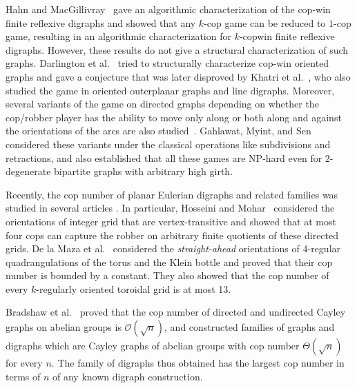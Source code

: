 \documentclass[a4paper,12pt]{amsart}
\begin{document}
Hahn and MacGillivray~\cite{hahn} gave an algorithmic characterization of the cop-win finite reflexive digraphs and showed that any $k$-cop game can be reduced to $1$-cop game, resulting in an algorithmic characterization for $k$-copwin finite reflexive digraphs. 
However, these results do not give a structural characterization of such graphs. 
Darlington et al.~\cite{darlington2016cops} tried to structurally characterize cop-win oriented graphs and gave a conjecture that was later disproved by Khatri et al.~\cite{khatri2018study}, who also studied the game in oriented outerplanar graphs and line digraphs. Moreover, several variants of the game on directed graphs depending on whether the cop/robber player has the ability to move only along or both along and against the orientations of the arcs are also studied~\cite{das2021cops}. Gahlawat, Myint, and Sen~\cite{gahlawat2023cops} considered these variants under the classical operations like subdivisions and retractions, and also established that all these games are NP-hard even for $2$-degenerate bipartite graphs with arbitrary high girth.

Recently, the cop number of planar Eulerian digraphs and related families was studied in several articles \cite{mohar2,   mohar}. In particular, Hosseini and Mohar~\cite{mohar} considered the orientations of integer grid that are vertex-transitive and showed that at most four cops can capture the robber on arbitrary finite quotients of these directed grids. De la Maza et al.~\cite{mohar2} considered the \textit{straight-ahead} orientations of 4-regular quadrangulations
of the torus and the Klein bottle and proved that their cop number is bounded
by a constant. They also showed that the cop number of every
$k$-regularly oriented
toroidal grid is at most 13.

Bradshaw et al.~\cite{bradshaw2021cops} proved that the cop number of directed and undirected Cayley graphs on abelian groups is $\mathcal{O}(\sqrt{n})$, and constructed families of graphs and digraphs which are Cayley graphs of abelian groups with cop number $\Theta(\sqrt{n})$ for every $n$. The family of digraphs thus obtained has the largest cop number in terms of $n$ of any known digraph construction.  
\end{document}
